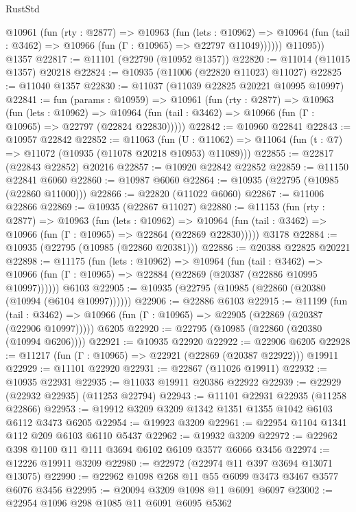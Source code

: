 \begin{lexlean}{RustStd}
\begin{coremodule}
{\begin{coremodule}
{{{{{{{{{{{{{{{{{{{{{{{{{{{{{{{{{{{{{{{{{{{{{{{{{{{{{{{{{{{{{{{{{{{{{{{{{{{{{{{{{{{{{          @10961
            (fun (rty : @2877) =>
            @10963
              (fun (lets : @10962) =>
              @10964 (fun (tail : @3462) => @10966 (fun (Γ : @10965) => @22797 @11049))))))
        @11095))
    @1357
@22817 := @11101 (@22790 (@10952 @1357))
@22820 := @11014 (@11015 @1357) @20218
@22824 := @10935 (@11006 (@22820 @11023) @11027)
@22825 := @11040 @1357
@22830 := @11037 (@11039 @22825 @20221 @10995 @10997)
@22841 := fun (params : @10959) =>
  @10961
    (fun (rty : @2877) =>
    @10963
      (fun (lets : @10962) =>
      @10964 (fun (tail : @3462) => @10966 (fun (Γ : @10965) => @22797 (@22824 @22830)))))
@22842 := @10960 @22841
@22843 := @10957 @22842
@22852 := @11063
    (fun (U : @11062) => @11064 (fun (t : @7) => @11072 (@10935 (@11078 @20218 @10953) @11089)))
@22855 := @22817 (@22843 @22852) @20216
@22857 := @10920 @22842 @22852
@22859 := @11150 @22841 @6060
@22860 := @10987 @6060
@22864 := @10935 (@22795 (@10985 (@22860 @11000)))
@22866 := @22820 (@11022 @6060)
@22867 := @11006 @22866
@22869 := @10935 (@22867 @11027)
@22880 := @11153
    (fun (rty : @2877) =>
    @10963
      (fun (lets : @10962) =>
      @10964 (fun (tail : @3462) => @10966 (fun (Γ : @10965) => @22864 (@22869 @22830)))))
    @3178
@22884 := @10935 (@22795 (@10985 (@22860 @20381)))
@22886 := @20388 @22825 @20221
@22898 := @11175
    (fun (lets : @10962) =>
    @10964
      (fun (tail : @3462) =>
      @10966 (fun (Γ : @10965) => @22884 (@22869 (@20387 (@22886 @10995 @10997))))))
    @6103
@22905 := @10935 (@22795 (@10985 (@22860 (@20380 (@10994 (@6104 @10997))))))
@22906 := @22886 @6103
@22915 := @11199
    (fun (tail : @3462) => @10966 (fun (Γ : @10965) => @22905 (@22869 (@20387 (@22906 @10997)))))
    @6205
@22920 := @22795 (@10985 (@22860 (@20380 (@10994 @6206))))
@22921 := @10935 @22920
@22922 := @22906 @6205
@22928 := @11217 (fun (Γ : @10965) => @22921 (@22869 (@20387 @22922))) @19911
@22929 := @11101 @22920
@22931 := @22867 (@11026 @19911)
@22932 := @10935 @22931
@22935 := @11033 @19911 @20386 @22922
@22939 := @22929 (@22932 @22935) (@11253 @22794)
@22943 := @11101 @22931 @22935 (@11258 @22866)
@22953 := @19912 @3209 @3209 @1342 @1351 @1355 @1042 @6103 @6112 @3473 @6205
@22954 := @19923 @3209
@22961 := @22954 @1104 @1341 @112 @209 @6103 @6110 @5437
@22962 := @19932 @3209
@22972 := @22962 @398 @1100 @11 @111 @3694 @6102 @6109 @3577 @6066 @3456
@22974 := @12226 @19911 @3209
@22980 := @22972 (@22974 @11 @397 @3694 @13071 @13075)
@22990 := @22962 @1098 @268 @11 @55 @6099 @3473 @3467 @3577 @6076 @3456
@22995 := @20094 @3209 @1098 @11 @6091 @6097
@23002 := @22954 @1096 @298 @1085 @11 @6091 @6095 @5362
}}}}}}}}}}}}}}}}}}}}}}}}}}}}}}}}}}}}}}}}}}}}}}}}}}}}}}}}}}}}}}}}}}}}}}}}}}}}}}}}}}}}}
\end{coremodule}}
\end{coremodule}
\end{lexlean}
